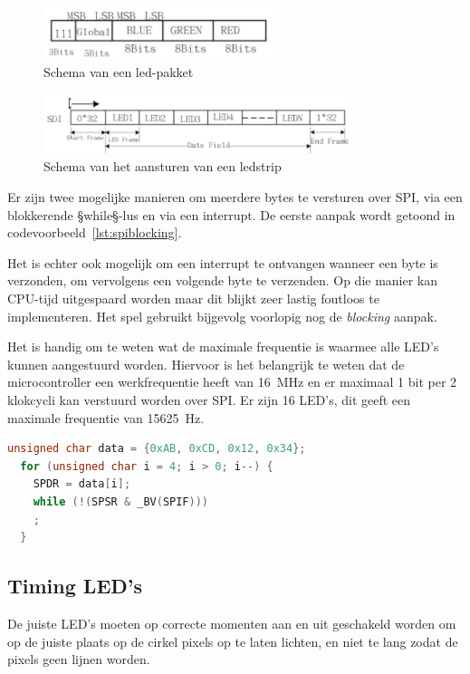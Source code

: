 \documentclass[12pt]{ugentreport}
\begin{document}
\begin{figure}
  \centering
  \includegraphics[width=0.6\textwidth]{img/ledpakket.png}
  \caption{Schema van een led-pakket}
  \label{fig:ledpakket}
\end{figure}

\begin{figure}
  \centering
  \includegraphics[width=0.8\textwidth]{img/ledcontrol.png}
  \caption{Schema van het aansturen van een ledstrip}
  \label{fig:ledcontrol}
\end{figure}

Er zijn twee mogelijke manieren om meerdere bytes te versturen over SPI,
via een blokkerende §while§-lus en via een interrupt.
De eerste aanpak wordt getoond in codevoorbeeld~\ref{lst:spiblocking}.

Het is echter ook mogelijk om een interrupt te ontvangen wanneer een byte is
verzonden,
om vervolgens een volgende byte te verzenden. Op die manier kan CPU-tijd
uitgespaard worden maar dit blijkt zeer lastig foutloos te implementeren.
Het spel gebruikt bijgevolg voorlopig nog de \textit{blocking} aanpak.

Het is handig om te weten wat de maximale frequentie is waarmee alle LED's
kunnen aangestuurd worden.
Hiervoor is het belangrijk te weten dat de microcontroller
een werkfrequentie heeft van \SI{16}{\mega\hertz}
en er maximaal 1 bit per 2 klokcycli kan verstuurd worden over SPI.
Er zijn 16 LED's, dit geeft een maximale frequentie van \SI{15625}{\hertz}.

\begin{lstlisting}[frame=lines,language=C,float,caption={Blocking SPI in C},label={lst:spiblocking}]
  unsigned char data = {0xAB, 0xCD, 0x12, 0x34};
  for (unsigned char i = 4; i > 0; i--) {
    SPDR = data[i];
    while (!(SPSR & _BV(SPIF)))
    ;
  }
\end{lstlisting}

\subsection{Timing LED's}
\label{sec:ledtiming}
De juiste LED's moeten op correcte momenten aan en uit geschakeld worden
om op de juiste plaats op de cirkel pixels op te laten lichten,
en niet te lang zodat de pixels geen lijnen worden.
\end{document}
